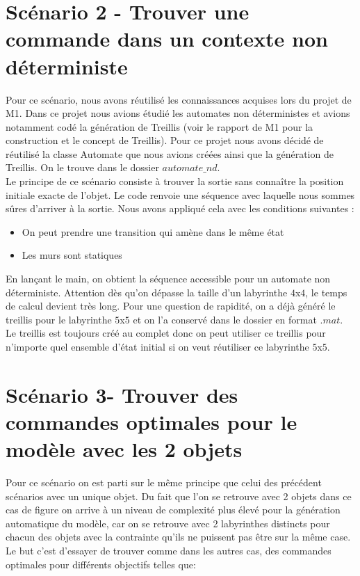 

\section{Scénario 2 - Trouver une commande dans un contexte non déterministe}
Pour ce scénario, nous avons réutilisé les connaissances acquises lors du projet de M1. Dans ce projet nous avions étudié les automates non déterministes et avions notamment codé la génération de Treillis (voir le rapport de M1 pour la construction et le concept de Treillis). Pour ce projet nous avons décidé de réutilisé la classe Automate que nous avions créées ainsi que la génération de Treillis. On le trouve dans le dossier $automate\_nd$. \\
Le principe de ce scénario consiste à trouver la sortie sans connaître la position initiale exacte de l'objet. Le code renvoie une séquence avec laquelle nous sommes sûres d'arriver à la sortie. Nous avons appliqué cela avec les conditions suivantes :
\begin{itemize}
\item On peut prendre une transition qui amène dans le même état
\item Les murs sont statiques
\end{itemize}

En lançant le main, on obtient la séquence accessible pour un automate non déterministe. Attention dès qu'on dépasse la taille d'un labyrinthe $4$x$4$, le temps de calcul devient très long. Pour une question de rapidité, on a déjà généré le treillis pour le labyrinthe $5$x$5$ et on l'a conservé dans le dossier en format $.mat$. Le treillis est toujours créé au complet donc on peut utiliser ce treillis pour n'importe quel ensemble d'état initial si on veut réutiliser ce labyrinthe $5$x$5$.

\section{Scénario 3- Trouver des commandes optimales pour le modèle avec les 2 objets}
Pour ce scénario on est parti sur le même principe que celui des précédent scénarios avec un unique objet. Du fait que l’on se retrouve avec 2 objets dans ce cas de figure on arrive à un niveau de complexité plus élevé pour la génération automatique du modèle, car on se retrouve avec 2 labyrinthes distincts pour chacun des objets avec la contrainte qu'ils ne puissent pas être sur la même case. Le but c’est d’essayer de trouver comme dans les autres cas, des commandes optimales pour différents objectifs telles que:
